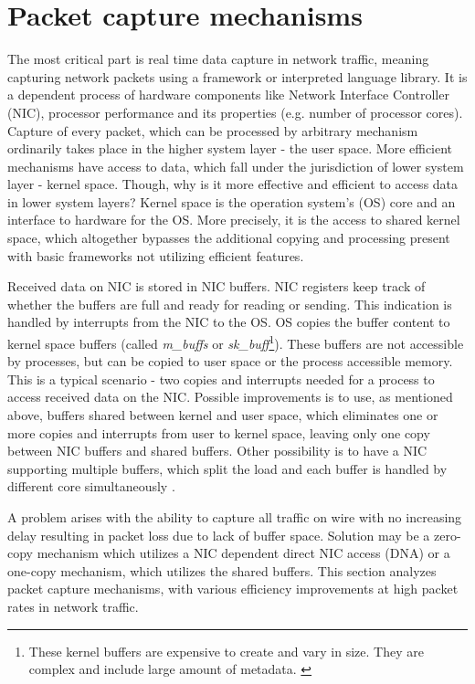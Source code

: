 \documentclass[12pt,a4paper,twoside]{report}
\begin{document}
	\section{Packet capture mechanisms} \label{analysis:mechs}
		The most critical part is real time data capture in network traffic, meaning capturing network packets using a framework or interpreted language library. It is a dependent process of hardware components like Network Interface Controller (NIC), processor performance and its properties (e.g. number of processor cores). Capture of every packet, which can be processed by arbitrary mechanism ordinarily takes place in the higher system layer - the user space. More efficient mechanisms have access to data, which fall under the jurisdiction of lower system layer - kernel space. Though, why is it more effective and efficient to access data in lower system layers? Kernel space is the operation system's (OS) core and an interface to hardware for the OS. More precisely, it is the access to shared kernel space, which altogether bypasses the additional copying and processing present with basic frameworks not utilizing efficient features.\par
		Received data on NIC is stored in NIC buffers. NIC registers keep track of whether the buffers are full and ready for reading or sending. This indication is handled by interrupts from the NIC to the OS. OS copies the buffer content to kernel space buffers (called \emph{m\_buffs} or \emph{sk\_buff}\footnote{These kernel buffers are expensive to create and vary in size. They are complex and include large amount of metadata. \cite{video:netmap}}). These buffers are not accessible by processes, but can be copied to user space or the process accessible memory. This is a typical scenario - two copies and interrupts needed for a process to access received data on the NIC. Possible improvements is to use, as mentioned above, buffers shared between kernel and user space, which eliminates one or more copies and interrupts from user to kernel space, leaving only one copy between NIC buffers and shared buffers. Other possibility is to have a NIC supporting multiple buffers, which split the load and each buffer is handled by different core simultaneously \cite{report:netmap}.\par
		A problem arises with the ability to capture all traffic on wire with no increasing delay resulting in packet loss due to lack of buffer space. Solution may be a zero-copy mechanism which utilizes a NIC dependent direct NIC access (DNA) or a one-copy mechanism, which utilizes the shared buffers. This section analyzes packet capture mechanisms, with various efficiency improvements at high packet rates in network traffic.
\end{document}
